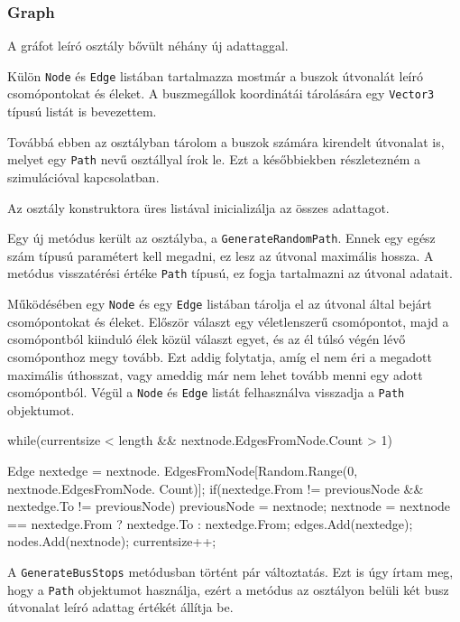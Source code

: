\subsubsection{Graph}

A gráfot leíró osztály bővült néhány új adattaggal. 

Külön \texttt{Node} és \texttt{Edge} listában tartalmazza mostmár a buszok útvonalát leíró csomópontokat és éleket. A buszmegállok koordinátái tárolására egy \texttt{Vector3} típusú listát is bevezettem.

Továbbá ebben az osztályban tárolom a buszok számára kirendelt útvonalat is, melyet egy \texttt{Path} nevű osztállyal írok le. Ezt a későbbiekben részletezném a szimulációval kapcsolatban.

Az osztály konstruktora üres listával inicializálja az összes adattagot.

Egy új metódus került az osztályba, a \texttt{GenerateRandomPath}. Ennek egy egész szám típusú paramétert kell megadni, ez lesz az útvonal maximális hossza. A metódus visszatérési értéke \texttt{Path} típusú, ez fogja tartalmazni az útvonal adatait.

Működésében egy \texttt{Node} és egy \texttt{Edge} listában tárolja el az útvonal által bejárt csomópontokat és éleket. Először választ egy véletlenszerű csomópontot, majd a csomópontból kiinduló élek közül választ egyet, és az él túlsó végén lévő csomóponthoz megy tovább. Ezt addig folytatja, amíg el nem éri a megadott maximális úthosszat, vagy ameddig már nem lehet tovább menni egy adott csomópontból. Végül a \texttt{Node} és \texttt{Edge} listát felhasználva visszadja a \texttt{Path} objektumot.
\begin{cpp}
while(currentsize < length && nextnode.EdgesFromNode.Count > 1)
            {
                Edge nextedge = nextnode.
                EdgesFromNode[Random.Range(0, nextnode.EdgesFromNode.
                Count)];
                if(nextedge.From != previousNode && nextedge.To != 
                previousNode)
                {
                    previousNode = nextnode;
                    nextnode = nextnode == nextedge.From ? nextedge.To : 
                    nextedge.From;
                    edges.Add(nextedge);
                    nodes.Add(nextnode);
                    currentsize++;
                }
                
            }
\end{cpp}

A \texttt{GenerateBusStops} metódusban történt pár változtatás. Ezt is úgy írtam meg, hogy a \texttt{Path} objektumot használja, ezért a metódus az osztályon belüli két busz útvonalat leíró adattag értékét állítja be.

